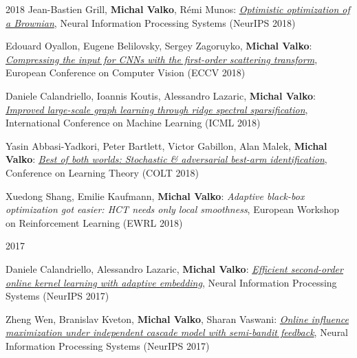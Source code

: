 \documentclass{resume}
\begin{document}
\begin{category}{2018}
\citembullet
Jean-Bastien Grill, {\bf Michal Valko}, R\' emi Munos:
\href{http://researchers.lille.inria.fr/~valko/hp/serve.php?what=publications/grill2018optimistic.pdf}
{\emph{Optimistic optimization of a Brownian}},
Neural Information Processing Systems
({\sf NeurIPS 2018}) 

\citembullet
Edouard Oyallon, Eugene Belilovsky, Sergey Zagoruyko, {\bf Michal Valko}:
\href{http://researchers.lille.inria.fr/~valko/hp/serve.php?what=publications/oyallon2018compressing.pdf}
{\emph{Compressing the input for CNNs with the first-order scattering transform}},
European Conference on Computer Vision
({\sf ECCV 2018}) 

\citembullet
Daniele Calandriello,  Ioannis Koutis,  Alessandro Lazaric, {\bf Michal Valko}:
\href{http://researchers.lille.inria.fr/~valko/hp/serve.php?what=publications/calandriello2018improved.pdf}
{\emph{Improved large-scale graph learning through ridge spectral sparsification}},
International Conference on Machine Learning
({\sf ICML 2018}) 

\citembullet
Yasin Abbasi-Yadkori, Peter Bartlett, Victor Gabillon, Alan Malek,  {\bf Michal Valko}:
\href{http://researchers.lille.inria.fr/~valko/hp/serve.php?what=publications/abbasi-yadkori2018best.pdf}
{\emph{Best of both worlds: Stochastic \& adversarial best-arm identification}},
Conference on Learning Theory
({\sf COLT 2018}) 

\citembullet
Xuedong Shang, Emilie Kaufmann, {\bf Michal Valko}:
\emph{Adaptive black-box optimization got easier: HCT needs only local smoothness},
European Workshop on Reinforcement Learning
({\sf EWRL 2018}) 

\end{category}\begin{category}{2017}

\citembullet
Daniele Calandriello, Alessandro Lazaric, {\bf Michal Valko}:
\href{http://researchers.lille.inria.fr/~valko/hp/serve.php?what=publications/calandriello2017efficient.pdf}
{\emph{Efficient second-order online kernel learning with adaptive embedding}},
Neural Information Processing Systems
({\sf NeurIPS 2017}) 


\citembullet
Zheng Wen, Branislav Kveton, {\bf Michal Valko}, Sharan Vaswani:
\href{http://researchers.lille.inria.fr/~valko/hp/serve.php?what=publications/wen2017online.pdf}
{\emph{Online influence maximization under independent cascade model with semi-bandit feedback}},
Neural Information Processing Systems
({\sf NeurIPS 2017})



\end{category}
\end{document}
